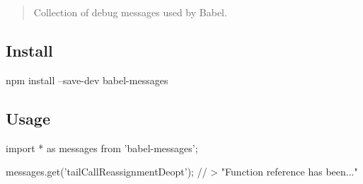 \begin{quote}
Collection of debug messages used by Babel. \end{quote}


\subsection*{Install}


\begin{DoxyCode}
npm install --save-dev babel-messages
\end{DoxyCode}


\subsection*{Usage}


\begin{DoxyCode}
import * as messages from 'babel-messages';

messages.get('tailCallReassignmentDeopt');
// > "Function reference has been..."
\end{DoxyCode}
 